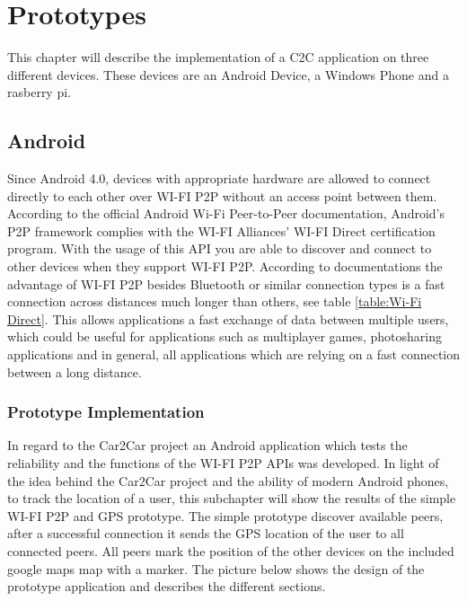 \chapter{Prototypes}
\label{cha:Prototypes}
This chapter will describe the implementation of a C2C application on three different devices. These devices are an Android Device, a Windows Phone and a rasberry pi.

\section{Android}
Since Android 4.0, devices with appropriate hardware are allowed to connect directly to each other over WI-FI P2P without an access point between them. According to the official Android Wi-Fi Peer-to-Peer documentation, Android's P2P framework complies with the WI-FI Alliances' WI-FI Direct certification program. With the usage of this API you are able to discover and connect to other devices when they support WI-FI P2P.  According to documentations the advantage of WI-FI P2P besides Bluetooth or similar connection types is a fast connection across distances much longer than others, see table \ref{table:Wi-Fi Direct}. This allows applications a fast exchange of data between multiple users, which could be useful for applications such as multiplayer games, photosharing applications and in general, all applications which are relying on a fast connection between a long distance.

\subsection*{Prototype Implementation}
\label{subsec:AndroidPrototype}
In regard to the Car2Car project an Android application which tests the reliability and the functions of the WI-FI P2P APIs was developed. In light of the idea behind the Car2Car project and the ability of modern Android phones, to track the location of a user, this subchapter will show the results of the simple WI-FI P2P and GPS prototype.
The simple prototype discover available peers, after a successful connection it  sends the GPS location of the user to all connected peers. All peers mark the position of the other devices on the included google maps map with a marker. The picture below shows the design of the prototype application and describes the different sections.

